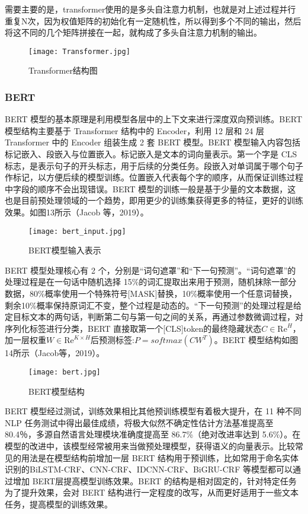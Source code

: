 \documentclass[letterpaper]{article}
\begin{document}
    需要主要的是，transformer使用的是多头自注意力机制，也就是对上述过程并行重复N次，因为权值矩阵的初始化有一定随机性，所以得到多个不同的输出，然后将这不同的几个矩阵拼接在一起，就构成了多头自注意力机制的输出。
    
    \newpage
    \begin{figure}[h]
      \centering
      \texttt{[image: Transformer.jpg]}
      \caption{Transformer结构图}
    \end{figure}

    \subsubsection{BERT}
    BERT 模型的基本原理是利用模型各层中的上下文来进行深度双向预训练。BERT模型结构主要基于 Transformer 结构中的 Encoder，利用 12 层和 24 层 Transformer 中的 Encoder 组装生成 2 套 BERT 模型。BERT 模型输入内容包括标记嵌入、段嵌入与位置嵌入。标记嵌入是文本的词向量表示。第一个字是 CLS 标志，是表示句子的开头标志，用于后续的分类任务。段嵌入对单词属于哪个句子作标记，以方便后续的模型训练。位置嵌入代表每个字的顺序，从而保证训练过程中字段的顺序不会出现错误。BERT 模型的训练一般是基于少量的文本数据，这也是目前预处理领域的一个趋势，即用更少的训练集获得更多的特征，更好的训练效果。如图13所示（Jacob 等，2019）。 

    \newpage
    \begin{figure}[h]
      \centering
      \texttt{[image: bert\_input.jpg]}
      \caption{BERT模型输入表示}
    \end{figure}

    BERT 模型处理核心有 2 个，分别是“词句遮罩”和“下一句预测”。“词句遮罩”的处理过程是在一句话中随机选择 15\%的词汇提取出来用于预测，随机抹除一部分数据，80\%概率使用一个特殊符号[MASK]替换，10\%概率使用一个任意词替换，剩余10\%概率保持原词汇不变，整个过程是动态的。“下一句预测”的处理过程是给定目标文本的两句话，判断第二句与第一句之间的关系，再通过参数微调过程，对序列化标签进行分类，BERT 直接取第一个[CLS]token的最终隐藏状态$C\in \text{Re}^H$，加一层权重$W\in \text{Re}^{K×H}$后预测标签:$P=softmax(CW^T)$。BERT 模型结构如图14所示（Jacob等，2019）。
    
    \begin{figure}[h]
      \centering
      \texttt{[image: bert.jpg]}
      \caption{BERT模型结构}
    \end{figure}

    BERT 模型经过测试，训练效果相比其他预训练模型有着极大提升，在 11 种不同 NLP 任务测试中得出最佳成绩，将极大似然不确定性估计方法基准提高至 80.4％，多源自然语言处理模块准确度提高至 86.7\%（绝对改进率达到 5.6\%）。在模型的改进中，该模型经常被用来当做预处理模型，获得语义的向量表示。比较常见的用法是在模型结构前增加一层 BERT 结构用于预训练，比如常用于命名实体识别的BiLSTM-CRF、CNN-CRF、IDCNN-CRF、BiGRU-CRF 等模型都可以通过增加 BERT层提高模型训练效果。BERT 的结构是相对固定的，针对特定任务为了提升效果，会对 BERT 结构进行一定程度的改写，从而更好适用于一些文本任务，提高模型的训练效果。
\end{document}
